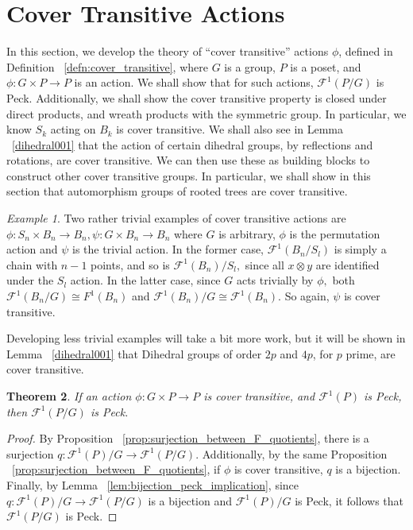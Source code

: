 \documentclass{amsart}
\newtheorem{thm}{Theorem}[subsection]
\theoremstyle{remark}
\newtheorem{eg}[thm]{Example}
\begin{document}
\section{Cover Transitive Actions}
In this section, we develop the theory of ``cover transitive'' actions $\phi$, defined in Definition ~\ref{defn:cover_transitive}, where $G$ is a group, $P$ is a poset, and $\phi:G\times P \rightarrow P$ is an action. We shall show that for such actions, $\mathcal F^1(P/G)$ is Peck. Additionally, we shall show the cover transitive property is closed under direct products, and wreath products with the symmetric group. In particular, we know $S_k$ acting on $B_k$ is cover transitive. We shall also see in Lemma ~\ref{dihedral001} that the action of certain dihedral groups, by reflections and rotations, are cover transitive. We can then use these as building blocks to construct other cover transitive groups. In particular, we shall show in this section that automorphism groups of rooted trees are cover transitive.

\begin{eg}
\label{eg:trivial_edgequot}
Two rather trivial examples of cover transitive actions are $\phi:S_n\times B_n \rightarrow B_n,\psi:G\times B_n\rightarrow B_n$ where $G$ is arbitrary, $\phi$ is the permutation action and $\psi$ is the trivial action. In the former case, $\mathcal F^1(B_n/S_l)$ is simply a chain with $n-1$ points, and so is $\mathcal F^1(B_n)/S_l,$ since all $x\otimes y$ are identified under the $S_l$ action. In the latter case, since $G$ acts trivially by $\phi,$ both  $\mathcal F^1(B_n/G) \cong F^1(B_n)$ and $\mathcal F^1(B_n)/G \cong \mathcal F^1(B_n).$ So again, $\psi$ is cover transitive.

Developing less trivial examples will take a bit more work, but it will be shown in Lemma ~\ref{dihedral001} that Dihedral groups of order $2p$ and $4p$, for $p$ prime, are cover transitive.
\end{eg}

\begin{thm}
If an action $\phi:G \times P \rightarrow P$ is cover transitive, and $\mathcal F^1(P)$ is Peck, then $\mathcal{F}^1(P/G)$ is Peck.
\end{thm}
\begin{proof}
By Proposition ~\ref{prop:surjection_between_F_quotients}, there is a surjection $q:\mathcal F^1(P)/G \rightarrow \mathcal F^1(P/G).$ Additionally, by the same Proposition ~\ref{prop:surjection_between_F_quotients}, if $\phi$ is cover transitive, $q$ is a bijection. Finally, by Lemma ~\ref{lem:bijection_peck_implication}, since $q:\mathcal F^1(P)/G \rightarrow \mathcal F^1(P/G)$ is a bijection and $\mathcal F^1(P)/G$ is Peck, it follows that $\mathcal F^1(P/G)$ is Peck.
\end{proof}
\end{document}
